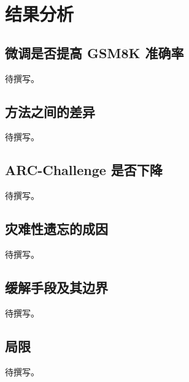 \section{结果分析}

\subsection{微调是否提高 GSM8K 准确率}

待撰写。

\subsection{方法之间的差异}

待撰写。

\subsection{ARC-Challenge 是否下降}

待撰写。

\subsection{灾难性遗忘的成因}

待撰写。

\subsection{缓解手段及其边界}

待撰写。

\subsection{局限}

待撰写。
